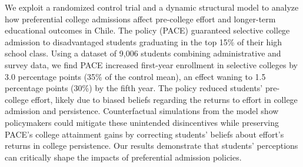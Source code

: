 

We exploit a randomized control trial and a dynamic structural model to analyze how preferential college admissions affect pre-college effort and longer-term educational outcomes in Chile. The policy (PACE) guaranteed selective college admission to disadvantaged students graduating in the top 15\% of their high school class. Using a dataset of 9,006 students combining administrative and survey data, we find PACE increased first-year enrollment in selective colleges by 3.0 percentage points (35\% of the control mean), an effect waning to 1.5 percentage points (30\%) by the fifth year. The policy reduced students' pre-college effort, likely due to biased beliefs regarding the returns to effort in college admission and persistence. Counterfactual simulations from the model show policymakers could mitigate these unintended disincentives while preserving PACE’s college attainment gains by correcting students' beliefs about effort's returns in college persistence. Our results demonstrate that students' perceptions can critically shape the impacts of preferential admission policies.


